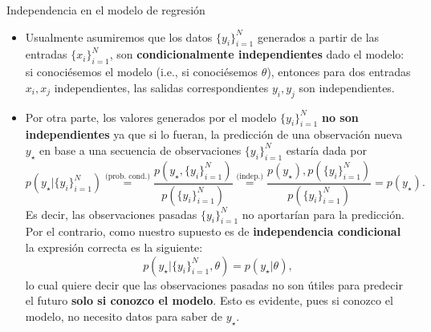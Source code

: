 \documentclass[handout, 9pt]{beamer}
\begin{document}
\begin{frame}{Independencia en el modelo de regresión}

\begin{itemize}
	\item Usualmente asumiremos que los datos $\{y_i\}_{i=1}^N$ generados a partir de las entradas $\{x_i\}_{i=1}^N$, son \textbf{condicionalmente independientes} dado el modelo: si conociésemos el modelo (i.e., si conociésemos $\theta$), entonces para dos entradas $x_i,x_j$ independientes, las  salidas correspondientes $y_i,y_j$ son independientes.\pause
	\item  Por otra parte, los valores generados por el modelo $\{y_i\}_{i=1}^N$ \textbf{no son independientes} ya que si lo fueran, la predicción de una observación nueva $y_\star$ en base a una secuencia de observaciones $\{y_i\}_{i=1}^N$ estaría dada por
\begin{equation*}
	p(y_\star|\{y_i\}_{i=1}^N) 
	\stackrel{\text{(prob. cond.)}}{=} \frac{p(y_\star,\{y_i\}_{i=1}^N)} {p(\{y_i\}_{i=1}^N)} 
	\stackrel{\text{(indep.)}}{=} \frac{p(y_\star),p(\{y_i\}_{i=1}^N)} {p(\{y_i\}_{i=1}^N)}
	=p(y_\star).
\end{equation*}
Es decir, las observaciones pasadas $\{y_i\}_{i=1}^N$ no aportarían para la predicción. \pause Por  el contrario, como nuestro supuesto es de \textbf{independencia condicional} la expresión correcta es  la siguiente: 
\begin{equation*}
	p(y_\star|\{y_i\}_{i=1}^N,\theta)  
	=p(y_\star|\theta),
\end{equation*}\pause
lo cual quiere decir que las  observaciones pasadas no son útiles para predecir el  futuro \textbf{solo si conozco el modelo}. Esto es evidente, pues si conozco el modelo, no necesito datos para saber de $y_\star$.

\end{itemize}
	
\end{frame}
\end{document}
